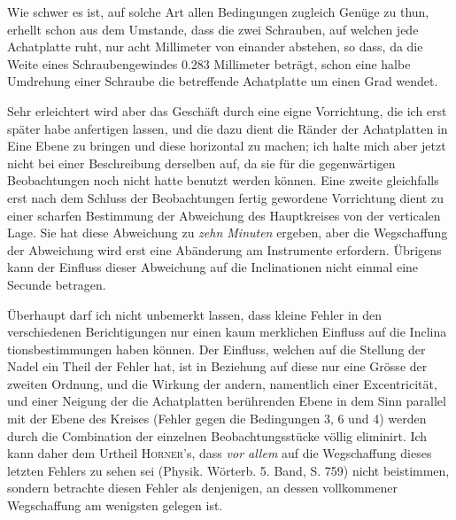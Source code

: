 Wie schwer es ist, auf solche Art allen Bedingungen zugleich Genüge zu thun, erhellt schon aus dem Umstande, dass die zwei Schrauben, auf welchen jede Achatplatte ruht, nur acht Millimeter von einander abstehen, so dass, da die Weite eines Schraubengewindes $0.283$ Millimeter beträgt, schon eine halbe Umdrehung einer Schraube die betreffende Achatplatte um einen Grad wendet.

Sehr erleichtert wird aber das Geschäft durch eine eigne Vorrichtung, die ich erst später habe anfertigen lassen, und die dazu dient die Ränder der Achatplatten in Eine Ebene zu bringen und diese horizontal zu machen; ich halte mich aber jetzt nicht bei einer Beschreibung derselben auf, da sie für die gegenwärtigen Beobachtungen noch nicht hatte benutzt werden können. Eine zweite gleichfalls erst nach dem Schluss der Beobachtungen fertig gewordene Vorrichtung dient zu einer scharfen Bestimmung der Abweichung des Hauptkreises von der verticalen Lage. Sie hat diese Abweichung zu \textit{zehn Minuten} ergeben, aber die Wegschaffung der Abweichung wird erst eine Abänderung am Instrumente erfordern. Übrigens kann der Einfluss dieser Abweichung auf die Inclinationen nicht einmal eine Secunde betragen.

Überhaupt darf ich nicht unbemerkt lassen, dass kleine Fehler in den verschiedenen Berichtigungen nur einen kaum merklichen Einfluss auf die Inclina%
%
tionsbestimmungen haben können. Der Einfluss, welchen auf die Stellung der Nadel ein Theil der Fehler hat, ist in Beziehung auf diese nur eine Grösse der zweiten Ordnung, und die Wirkung der andern, namentlich einer Excentricität, und einer Neigung der die Achatplatten berührenden Ebene in dem Sinn parallel mit der Ebene des Kreises (Fehler gegen die Bedingungen 3, 6 und 4) werden durch die Combination der einzelnen Beobachtungsstücke völlig eliminirt. Ich kann daher dem Urtheil \textsc{Horner}'s, dass \textit{vor allem} auf die Wegschaffung dieses letzten Fehlers zu sehen sei (Physik. Wörterb. 5. Band, S. 759) nicht beistimmen, sondern betrachte diesen Fehler als denjenigen, an dessen vollkommener Wegschaffung am wenigsten gelegen ist.

